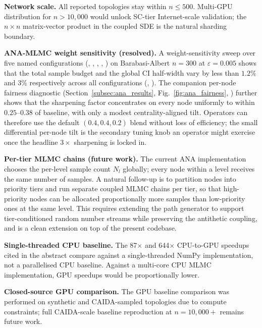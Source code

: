 \documentclass{ieeeaccess}
\begin{document}
\par\textbf{Network scale.} All reported topologies stay within $n\le500$. Multi-GPU distribution
for $n>10{,}000$ would unlock SC-tier Internet-scale validation; the $n\times n$ matrix-vector
product in the coupled SDE is the natural sharding boundary.

\par\textbf{ANA-MLMC weight sensitivity (resolved).} A weight-sensitivity sweep over five named
configurations (, , ,
, ) on Barabasi-Albert $n=300$ at $\varepsilon=0.005$ shows
that the total sample budget and the global CI half-width vary by less than $1.2\%$ and $3\%$
respectively across all configurations (,
). The companion per-node fairness
diagnostic (Section~\ref{subsec:ana_results}, Fig.~\ref{fig:ana_fairness},
) further shows that the sharpening factor concentrates
on every node uniformly to within $0.25$--$0.38$ of baseline, with only a modest
centrality-aligned tilt. Operators can therefore use the default $(0.4,0.4,0.2)$ blend without
loss of efficiency; the small differential per-node tilt is the secondary tuning knob an operator
might exercise once the headline $3\!\times$ sharpening is locked in.

\par\textbf{Per-tier MLMC chains (future work).} The current ANA implementation chooses the
per-level sample count $N_l$ globally; every node within a level receives the same number of
samples. A natural follow-up is to partition nodes into priority tiers and run separate coupled
MLMC chains per tier, so that high-priority nodes can be allocated proportionally more samples
than low-priority ones at the same level. This requires extending the path generator to support
tier-conditioned random number streams while preserving the antithetic coupling, and is a clean
extension on top of the present codebase.

\par\textbf{Single-threaded CPU baseline.} The 87$\times$ and 644$\times$ CPU-to-GPU speedups
cited in the abstract compare against a single-threaded NumPy implementation, not a parallelised
CPU baseline. Against a multi-core CPU MLMC implementation, GPU speedups would be proportionally
lower.

\par\textbf{Closed-source GPU comparison.} The GPU baseline comparison was performed on synthetic
and CAIDA-sampled topologies due to compute constraints; full CAIDA-scale baseline reproduction
at $n=10{,}000+$ remains future work.
\end{document}
